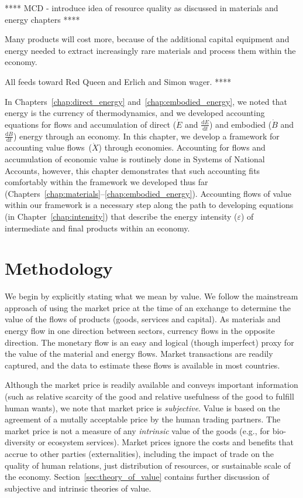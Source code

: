 **** MCD - introduce idea of resource quality as discussed in materials and energy chapters ****

Many products will cost more, because of the additional capital equipment and energy
needed to extract increasingly rare materials and process them
within the economy.

All feeds toward Red Queen and Erlich and Simon wager. ****

In Chapters~\ref{chap:direct_energy} and~\ref{chap:embodied_energy}, 
we noted that energy is the currency of thermodynamics,
and we developed accounting equations for flows and accumulation of 
direct ($\dot{E}$ and $\frac{\mathrm{d}E}{\mathrm{d}t}$) 
and embodied ($\dot{B}$ and $\frac{\mathrm{d}B}{\mathrm{d}t}$) 
energy through an economy.
In this chapter, we develop a framework for accounting
value flows~($\dot{X}$) through economies.
Accounting for flows and accumulation of economic value is 
routinely done in Systems of National Accounts,
however, this chapter demonstrates that such accounting
fits comfortably within the framework we developed thus far
(Chapters~\ref{chap:materials}--\ref{chap:embodied_energy}).
Accounting flows of value within our framework is a necessary step along
the path to developing equations (in Chapter~\ref{chap:intensity}) 
that describe the energy intensity ($\varepsilon$) of intermediate
and final products within an economy.


\section{Methodology}
\label{sec:Value_Methodology}

We begin by explicitly stating what we mean by value. 
We follow the mainstream approach 
of using the market price at the time of an exchange
to determine the value of the flows of products (goods, services and capital). 
As materials and energy flow in one direction between sectors, 
currency flows in the opposite direction. 
The monetary flow is an easy and logical (though imperfect)
proxy for the value of the material and energy flows. 
Market transactions are readily captured, 
and the data 
to estimate these flows is available in most countries.\cite{IIOA-Data}

Although the market price is readily available and conveys important information (such as
relative scarcity of the good and relative usefulness of the good to fulfill human wants), we note that market
price is \emph{subjective}.  
Value is based on the agreement of a mutally acceptable price 
by the human trading partners. 
The market price
is not a measure of any \emph{intrinsic}
value of the goods (e.g., for bio-diversity or ecosystem services). 
Market prices ignore the costs and benefits that accrue 
to other parties (externalities), 
including the impact of trade on the quality of human relations, 
just distribution of resources, 
or sustainable scale of the economy.\cite[p.~55]{Daly1997} 
Section~\ref{sec:theory_of_value} 
contains further discussion of subjective and intrinsic theories of value. 

